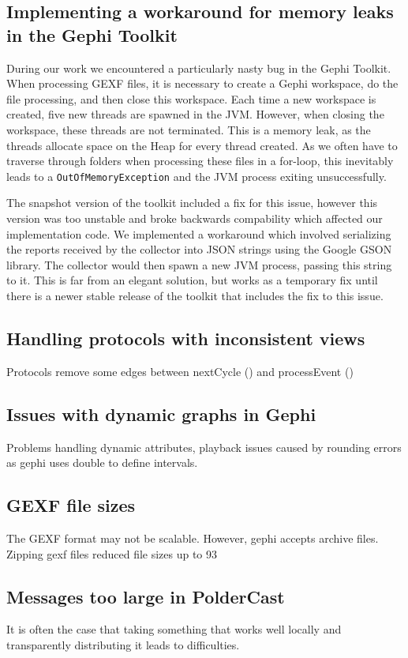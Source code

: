 \subsection{Implementing a workaround for memory leaks in the Gephi Toolkit}
During our work we encountered a particularly nasty bug in the Gephi
Toolkit. When processing GEXF files, it is necessary to create a Gephi
workspace, do the file processing, and then close this workspace. Each
time a new workspace is created, five new threads are spawned in the
JVM\@. However, when closing the workspace, these threads are not
terminated. This is a memory leak, as the threads allocate space on the
Heap for every thread created. As we often have to traverse through
folders when processing these files in a for-loop, this inevitably leads
to a \texttt{OutOfMemoryException} and the JVM process exiting
unsuccessfully.

The snapshot version of the toolkit included a fix for this issue,
however this version was too unstable and broke backwards compability
which affected our implementation code. We implemented a workaround
which involved serializing the reports received by the collector into
JSON strings using the Google GSON~\cite{gson} library. The
collector would then spawn a new JVM process, passing this string to it.
This is far from an elegant solution, but works as a temporary fix
until there is a newer stable release of the toolkit that includes the
fix to this issue.

\subsection{Handling protocols with inconsistent views}
Protocols remove some edges between nextCycle () and processEvent ()
\subsection{Issues with dynamic graphs in Gephi}
Problems handling dynamic attributes, playback issues caused by
rounding errors as gephi uses double to define intervals.
\subsection{GEXF file sizes}
The GEXF format may not be scalable. However, gephi accepts
archive files. Zipping gexf files reduced file sizes up to 93%
\subsection{Messages too large in PolderCast}
It is often the case that taking something that works well
locally and transparently distributing it leads to difficulties.
